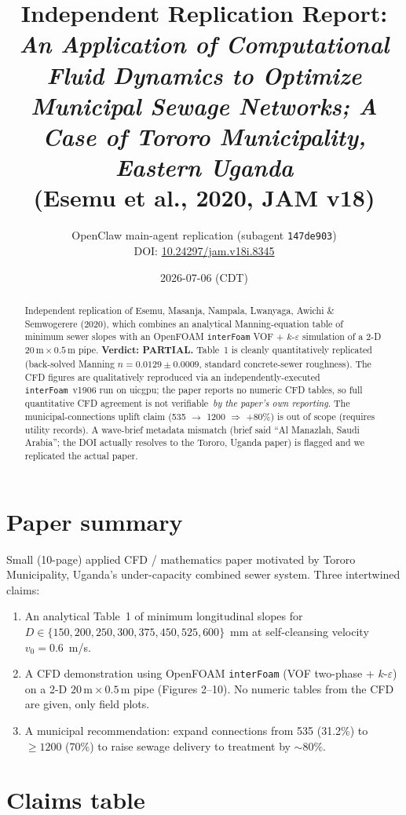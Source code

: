 \documentclass[11pt,a4paper]{article}
\title{Independent Replication Report:\\
\emph{An Application of Computational Fluid Dynamics to Optimize Municipal
Sewage Networks; A Case of Tororo Municipality, Eastern Uganda}\\
(Esemu et al., 2020, JAM v18)}
\author{OpenClaw main-agent replication (subagent \texttt{147de903})\\
DOI: \href{https://doi.org/10.24297/jam.v18i.8345}{10.24297/jam.v18i.8345}}
\date{2026-07-06 (CDT)}
\begin{document}
\maketitle

\begin{abstract}
Independent replication of Esemu, Masanja, Nampala, Lwanyaga, Awichi \& Semwogerere
(2020), which combines an analytical Manning-equation table of minimum sewer slopes with
an OpenFOAM \texttt{interFoam} VOF + $k$-$\varepsilon$ simulation of a 2-D $20\,\mathrm{m}
\times 0.5\,\mathrm{m}$ pipe. \textbf{Verdict: PARTIAL.} Table~1 is cleanly quantitatively
replicated (back-solved Manning $n = 0.0129 \pm 0.0009$, standard concrete-sewer
roughness). The CFD figures are qualitatively reproduced via an independently-executed
\texttt{interFoam}~v1906 run on uicgpu; the paper reports no numeric CFD tables, so full
quantitative CFD agreement is not verifiable~\emph{by the paper's own reporting}. The
municipal-connections uplift claim (535 $\to$ 1200 $\Rightarrow$ +80\%) is out of scope
(requires utility records). A wave-brief metadata mismatch (brief said ``Al Manazlah,
Saudi Arabia''; the DOI actually resolves to the Tororo, Uganda paper) is flagged and
we replicated the actual paper.
\end{abstract}

\section{Paper summary}

Small (10-page) applied CFD / mathematics paper motivated by Tororo Municipality,
Uganda's under-capacity combined sewer system. Three intertwined claims:
\begin{enumerate}
\item An analytical Table~1 of minimum longitudinal slopes for $D \in \{150, 200, 250, 300, 375, 450, 525, 600\}$~mm at self-cleansing velocity $v_0 = 0.6$~m/s.
\item A CFD demonstration using OpenFOAM \texttt{interFoam} (VOF two-phase + $k$-$\varepsilon$) on a 2-D $20\,\mathrm{m}\times0.5\,\mathrm{m}$ pipe (Figures 2--10). No numeric tables from the CFD are given, only field plots.
\item A municipal recommendation: expand connections from 535 (31.2\%) to $\geq 1200$ (70\%) to raise sewage delivery to treatment by $\sim 80\%$.
\end{enumerate}

\section{Claims table}
\end{document}
